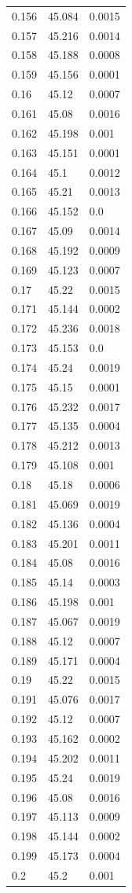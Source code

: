\begin{table}[H]
\begin{tabular}{lll}
0.156 & 45.084 & 0.0015 \\
0.157 & 45.216 & 0.0014 \\
0.158 & 45.188 & 0.0008 \\
0.159 & 45.156 & 0.0001 \\
0.16 & 45.12 & 0.0007 \\
0.161 & 45.08 & 0.0016 \\
0.162 & 45.198 & 0.001 \\
0.163 & 45.151 & 0.0001 \\
0.164 & 45.1 & 0.0012 \\
0.165 & 45.21 & 0.0013 \\
0.166 & 45.152 & 0.0 \\
0.167 & 45.09 & 0.0014 \\
0.168 & 45.192 & 0.0009 \\
0.169 & 45.123 & 0.0007 \\
0.17 & 45.22 & 0.0015 \\
0.171 & 45.144 & 0.0002 \\
0.172 & 45.236 & 0.0018 \\
0.173 & 45.153 & 0.0 \\
0.174 & 45.24 & 0.0019 \\
0.175 & 45.15 & 0.0001 \\
0.176 & 45.232 & 0.0017 \\
0.177 & 45.135 & 0.0004 \\
0.178 & 45.212 & 0.0013 \\
0.179 & 45.108 & 0.001 \\
0.18 & 45.18 & 0.0006 \\
0.181 & 45.069 & 0.0019 \\
0.182 & 45.136 & 0.0004 \\
0.183 & 45.201 & 0.0011 \\
0.184 & 45.08 & 0.0016 \\
0.185 & 45.14 & 0.0003 \\
0.186 & 45.198 & 0.001 \\
0.187 & 45.067 & 0.0019 \\
0.188 & 45.12 & 0.0007 \\
0.189 & 45.171 & 0.0004 \\
0.19 & 45.22 & 0.0015 \\
0.191 & 45.076 & 0.0017 \\
0.192 & 45.12 & 0.0007 \\
0.193 & 45.162 & 0.0002 \\
0.194 & 45.202 & 0.0011 \\
0.195 & 45.24 & 0.0019 \\
0.196 & 45.08 & 0.0016 \\
0.197 & 45.113 & 0.0009 \\
0.198 & 45.144 & 0.0002 \\
0.199 & 45.173 & 0.0004 \\
0.2 & 45.2 & 0.001 \\
\bottomrule
\end{tabular}

\end{table}
